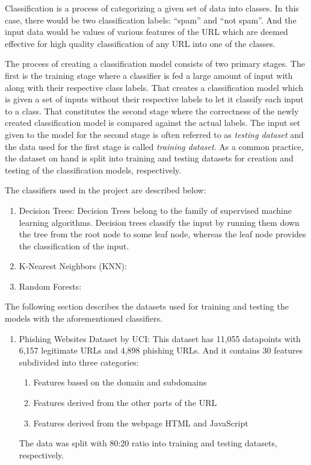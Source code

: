 \documentclass[conference]{IEEEtran}
\begin{document}
\par Classification is a process of categorizing a given set of data into classes.
In this case, there would be two classification labels: ``spam'' and ``not spam''.
And the input data would be values of various features of the URL which are deemed effective for high quality classification of any URL into one of the classes.


\par The process of creating a classification model consists of two primary stages.
The first is the training stage where a classifier is fed a large amount of input with along with their respective class labels.
That creates a classification model which is given a set of inputs without their respective labels to let it classify each input to a class.
That constitutes the second stage where the correctness of the newly created classification model is compared against the actual labels.
The input set given to the model for the second stage is often referred to as \emph{testing dataset} and the data used for the first stage is called \emph{training dataset}.
As a common practice, the dataset on hand is split into training and testing datasets for creation and testing of the classification models, respectively.

\par The classifiers used in the project are described below:
\begin{enumerate}
    \item Decision Trees:
          Decision Trees belong to the family of supervised machine learning algorithms.
          Decision trees classify the input by running them down the tree from the root node to some leaf node, whereas the leaf node provides the classification of the input.
    \item K-Nearest Neighbors (KNN):
    \item Random Forests:
\end{enumerate}

\par The following section describes the datasets used for training and testing the models with the aforementioned classifiers.
\begin{enumerate}
    \item Phishing Websites Dataset by UCI\cite{UCIDataset}:
          This dataset has 11,055 datapoints with 6,157 legitimate URLs and 4,898 phishing URLs.
          And it contains 30 features subdivided into three categories:
          \begin{enumerate}
              \item Features based on the domain and subdomains
              \item Features derived from the other parts of the URL
              \item Features derived from the webpage HTML and JavaScript
          \end{enumerate}
          The data was split with 80:20 ratio into training and testing datasets, respectively.
\end{enumerate}
\end{document}
